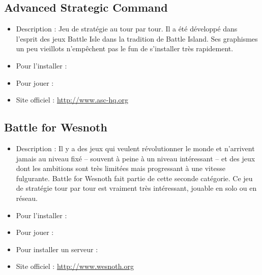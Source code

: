\subsection{Advanced Strategic Command}
\begin{itemize}
\begingroup
{}
\item Description : Jeu de stratégie au tour par tour. Il a été développé dans l'esprit des jeux Battle Isle dans la tradition de Battle Island. Ses graphismes un peu vieillots n'empêchent pas le fun de s'installer très rapidement.{\par}
\item Pour l'installer : 
\item Pour jouer : 
\item Site officiel : \url{http://www.asc-hq.org}{\par}
\endgroup
\end{itemize}
\subsection{Battle for Wesnoth}
\begin{itemize}
\begingroup
{}
\item Description : Il y a des jeux qui veulent révolutionner le monde et n'arrivent jamais au niveau fixé -- souvent à peine à un niveau intéressant -- et des jeux dont les ambitions sont très limitées mais progressant à une vitesse fulgurante. Battle for Wesnoth fait partie de cette seconde catégorie. Ce jeu de stratégie tour par tour est vraiment très intéressant, jouable en solo ou en réseau.{\par}
\endgroup
\item Pour l'installer : 
\item Pour jouer : 
\item Pour installer un serveur : 
\item Site officiel : \url{http://www.wesnoth.org}{\par}
\end{itemize}
\newpage
